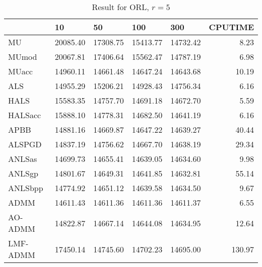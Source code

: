 \documentclass{article}
\begin{document}
\begin{table}[H]
		\caption{Result for ORL, $r =5$}
	\centering
	\begin{tabular}{|l|r|r|r|r|r|}
		\hline
		& \multicolumn{1}{l|}{10} & \multicolumn{1}{l|}{50} & \multicolumn{1}{l|}{100} & \multicolumn{1}{l|}{300} & \multicolumn{1}{l|}{CPUTIME} \\ \hline
		MU       & 20085.40                & 17308.75                & 15413.77                 & 14732.42                 & 8.23                         \\ \hline
		MUmod    & 20067.81                & 17406.64                & 15562.47                 & 14787.19                 & 6.98                         \\ \hline
		MUacc    & 14960.11                & 14661.48                & 14647.24                 & 14643.68                 & 10.19                        \\ \hline
		ALS      & 14955.29                & 15206.21                & 14928.43                 & 14756.34                 & 6.16                         \\ \hline
		HALS     & 15583.35                & 14757.70                & 14691.18                 & 14672.70                 & 5.59                         \\ \hline
		HALSacc  & 15888.10                & 14778.31                & 14682.50                 & 14641.19                 & 6.16                         \\ \hline
		APBB     & 14881.16                & 14669.87                & 14647.22                 & 14639.27                 & 40.44                        \\ \hline
		ALSPGD   & 14837.19                & 14756.62                & 14667.70                 & 14638.19                 & 29.34                        \\ \hline
		ANLSas   & 14699.73                & 14655.41                & 14639.05                 & 14634.60                 & 9.98                         \\ \hline
		ANLSgp   & 14801.67                & 14649.31                & 14641.85                 & 14632.81                 & 55.14                        \\ \hline
		ANLSbpp  & 14774.92                & 14651.12                & 14639.58                 & 14634.50                 & 9.67                         \\ \hline
		ADMM     & 14611.43                & 14611.36                & 14611.36                 & 14611.37                 & 6.55                         \\ \hline
		AO-ADMM  & 14822.87                & 14667.14                & 14644.08                 & 14634.95                 & 12.64                        \\ \hline
		LMF-ADMM & 17450.14                & 14745.60                & 14702.23                 & 14695.00                 & 130.97                       \\ \hline
	\end{tabular}
\end{table}
\end{document}
